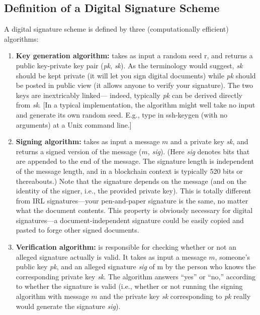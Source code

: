 \subsection{Definition of a Digital Signature Scheme}
A digital signature scheme is defined by three (computationally efficient) algorithms:\\
\begin{enumerate}
    \item \textbf{Key generation algorithm:} takes as input a random seed r, and returns a public key-private key pair (\textit{pk}, \textit{sk}). As the terminology would suggest, \textit{sk} should be kept
    private (it will let you sign digital documents) while \textit{pk} should be posted in public
    view (it allows anyone to verify your signature). The two keys are inextricably linked—
    indeed, typically \textit{pk} can be derived directly from \textit{sk}.
    [In a typical implementation, the algorithm might well take no input and generate its
    own random seed. E.g., type in ssh-keygen (with no arguments) at a Unix command
    line.]
    \item \textbf{Signing algorithm:} takes as input a message $m$ and a private key \textit{sk}, and returns a signed version of the message ($m$, \textit{sig}). (Here \textit{sig} denotes bits that are appended to the end of the message. The signature length is independent of the message length,
    and in a blockchain context is typically 520 bits or thereabouts.)
    Note that the signature depends on the message (and on the identity of the signer, i.e.,
    the provided private key). This is totally different from IRL signatures—your pen-and-paper signature is the same, no matter what the document contents. This property
    is obviously necessary for digital signatures—a document-independent signature could
    be easily copied and pasted to forge other signed documents.

    \item \textbf{Verification algorithm:} is responsible for checking whether or not an alleged signature actually is valid. It takes as input a message $m$, someone’s public key \textit{pk}, and an
alleged signature \textit{sig} of m by the person who knows the corresponding private key \textit{sk}.
The algorithm answers “yes” or “no,” according to whether the signature is valid (i.e.,
whether or not running the signing algorithm with message $m$ and the private key \textit{sk}
corresponding to \textit{pk} really would generate the signature \textit{sig}).
\end{enumerate}

